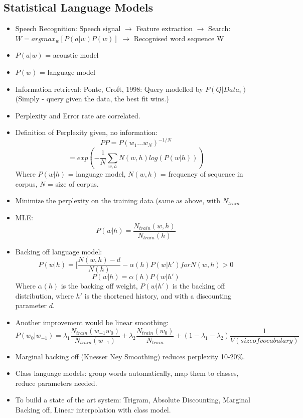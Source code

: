 \documentclass[11pt]{article}
\newenvironment{itemise}{
\begin{itemize}
  \setlength{\itemsep}{1pt}
  \setlength{\parskip}{0pt}
  \setlength{\parsep}{0pt}
}{\end{itemize}}
\begin{document}
\subsection{Statistical Language Models}
\begin{itemise}
\item Speech Recognition: Speech signal $\rightarrow$ Feature extraction $\rightarrow$ Search: $W = argmax_w[P(a|w)P(w)]$ $\rightarrow$ Recognised word sequence W
\item $P(a|w)$ = acoustic model
\item $P(w)$ = language model
\item Information retrieval: Ponte, Croft, 1998: Query modelled by $P(Q|Data_i)$ (Simply - query given the data, the best fit wins.)
\item Perplexity and Error rate are correlated. 
\item Definition of Perplexity given, no information: \begin{equation} PP = P(w_1...w_N)^{-1/N}\end{equation}
\begin{equation} = exp(-\frac{1}{N}\sum_{w,h}N(w,h)log(P(w|h)))\end{equation}
Where $P(w|h)$ = language model, $N(w,h)$ = frequency of sequence in corpus, $N$  = size of corpus.
\item Minimize the perplexity on the training data (same as above, with $N_{train}$
\item MLE: \begin{equation}P(w|h) = \frac{N_{train}(w,h)}{N_{train}(h)}\end{equation}
\item Backing off language model: \begin{equation}P(w|h) = [\frac{N(w,h)-d}{N(h)} -\alpha(h)P(w|h\prime) for N(w,h) > 0\end{equation}
\begin{equation}P(w|h) = \alpha(h)P(w|h\prime)\end{equation}
Where $\alpha(h)$ is the backing off weight, $P(w|h\prime)$ is the backing off distribution, where $h\prime$ is the shortened history, and with a discounting parameter $d$.
\item Another improvement would be linear smoothing: \\
\begin{equation}P(w_0|w_{-1}) = \lambda_1\frac{N_{train}(w_{-1}w_0)}{N_{train}(w_{-1})} + \lambda_2\frac{N_{train}(w_0)}{N_{train}} + (1 - \lambda_1 - \lambda_2)\frac{1}{V (size of vocabulary)}\end{equation}
\item Marginal backing off (Knesser Ney Smoothing) reduces perplexity 10-20\%. 
\item Class language models: group words automatically, map them to classes, reduce parameters needed.
\item To build a state of the art system: Trigram, Absolute Discounting, Marginal Backing off, Linear interpolation with class model. 
\end{itemise}
\end{document}
